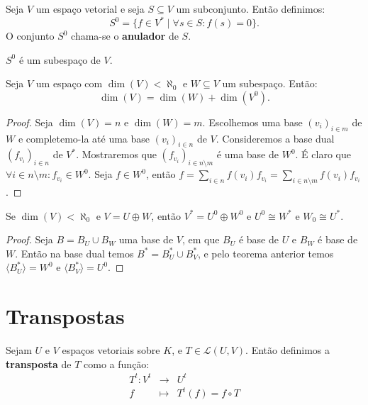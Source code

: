 \documentclass[11pt,twoside,a4paper]{book}
\begin{document}
\begin{definicao}
Seja $V$ um espaço vetorial e seja $S\subseteq V$ um subconjunto. Então definimos:
\[
S^0=\{f\in V^*\mid\forall s\in S:f(s)=0\}.
\]
O conjunto $S^0$ chama-se o \textbf{anulador} de $S$.
\end{definicao}

\begin{proposicao}
$S^0$ é um subespaço de $V$.
\end{proposicao}

\begin{teorema}
Seja $V$ um espaço com $\dim(V)<\aleph_0$ e $W\subseteq V$ um subespaço. Então:
\[
\dim(V)=\dim(W)+\dim(V^0).
\]
\end{teorema}
\begin{proof}
Seja $\dim(V)=n$ e $\dim(W)=m$. Escolhemos uma base $(v_i)_{i\in m}$ de $W$ e completemo-la até uma base $(v_i)_{i\in n}$ de $V$. Consideremos a base dual $(f_{v_i})_{i\in n}$ de $V^*$. Mostraremos que $(f_{v_i})_{i\in n\setminus m}$ é uma base de $W^0$. É claro que $\forall i\in n\setminus m:f_{v_i}\in W^0$. Seja $f\in W^0$, então $f=\sum_{i\in n}f(v_i)f_{v_i}=\sum_{i\in n\setminus m}f(v_i)f_{v_i}$.
\end{proof}

\begin{teorema}
Se $\dim(V)<\aleph_0$ e $V=U\oplus W$, então $V^*=U^0\oplus W^0$ e $U^0\cong W^*$ e $W_0\cong U^*$.
\end{teorema}
\begin{proof}
Seja $B=B_U\cup B_W$ uma base de $V$, em que $B_U$ é base de $U$ e $B_W$ é base de $W$. Então na base dual temos $B^*=B_U^*\cup B_V^*$, e pelo teorema anterior temos $\langle B_U^*\rangle=W^0$ e $\langle B_V^*\rangle=U^0$.
\end{proof}

\section{Transpostas}

\begin{definicao}
Sejam $U$ e $V$ espaços vetoriais sobre $K$, e $T\in\mathcal{L}(U,V)$. Então definimos a \textbf{transposta} de $T$ como a função:
\[
\begin{array}{rcl}
T^t:V^t&\rightarrow&U^t\\f&\mapsto&T^t(f)=f\circ T
\end{array}
\]
\end{definicao}
\end{document}
